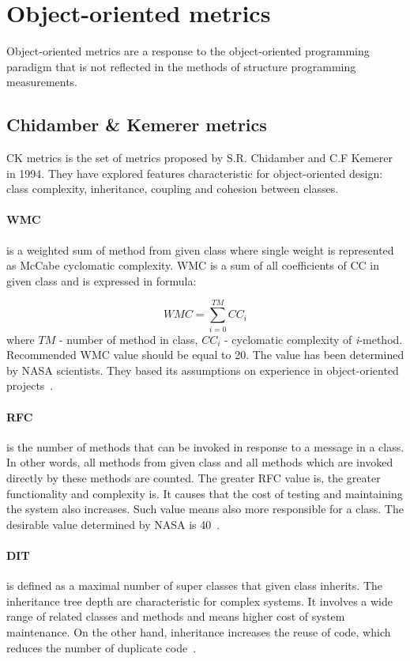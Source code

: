\section{Object-oriented metrics}
Object-oriented metrics are a response to the object-oriented programming paradigm that is not reflected in the methods of structure programming measurements.   

\subsection{Chidamber \& Kemerer metrics}
\ac{CK metrics} is the set of metrics proposed by S.R. Chidamber and C.F Kemerer in 1994. They have explored features characteristic for object-oriented design: class complexity, inheritance, coupling and cohesion between classes.   
\paragraph{\ac{WMC}} is a weighted sum of method from given class where single weight is represented as McCabe cyclomatic complexity. \ac{WMC} is a sum of all coefficients of \ac{CC} in given class and is expressed in formula:

\begin{equation}
WMC=\sum _{ i=0 }^{ TM }{ { CC }_{ i } } 
\end{equation}
where $TM$ - number of method in class, $CC_{i}$ - cyclomatic complexity of \textit{i}-method. Recommended \ac{WMC} value should be equal to 20. The value has been determined by NASA scientists. They based its assumptions on experience in object-oriented projects~\cite{nasa}.

\paragraph{\ac{RFC}} is the number of methods that can be invoked in response to a message in a class. In other words, all methods from given class and all methods which are invoked directly by these methods are counted. The greater \ac{RFC} value is, the greater functionality and complexity is. It causes that the cost of testing and maintaining the system also increases. Such value means also more responsible for a class. The desirable value determined by NASA is 40~\cite{nasa}.

\paragraph{\ac{DIT}} is defined as a maximal number of super classes that given class inherits.  The inheritance tree depth are characteristic for complex systems. It involves a wide range of related classes and methods and means higher cost of system maintenance. On the other hand, inheritance increases the reuse of code, which reduces the number of duplicate code~\cite{nasa}.

